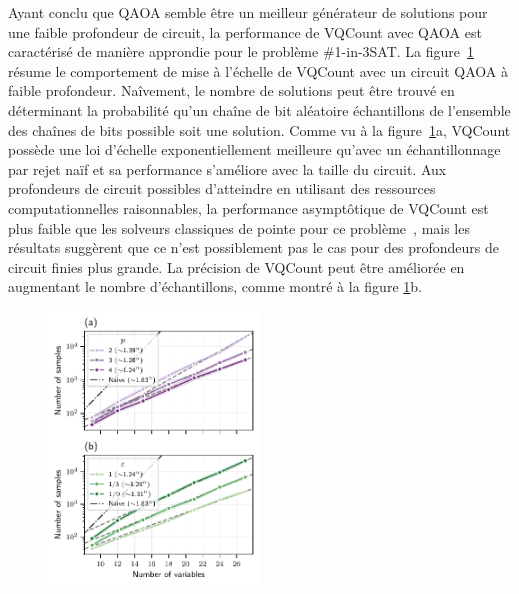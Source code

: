 Ayant conclu que QAOA semble être un meilleur générateur de solutions pour une faible profondeur de circuit, la performance de VQCount avec QAOA est caractérisé de manière approndie pour le problème \#1-in-3SAT. La figure~\ref{fig:1in3sat-number-of-samples} résume le comportement de mise à l'échelle de VQCount avec un circuit QAOA à faible profondeur. Naîvement, le nombre de solutions peut être trouvé en déterminant la probabilité qu'un chaîne de bit aléatoire échantillons de l'ensemble des chaînes de bits possible soit une solution. Comme vu à la figure~\ref{fig:1in3sat-number-of-samples}a, VQCount possède une loi d'échelle exponentiellement meilleure qu'avec un échantillonnage par rejet naïf et sa performance s'améliore avec la taille du circuit. Aux profondeurs de circuit possibles d'atteindre en utilisant des ressources computationnelles raisonnables, la performance asymptôtique de VQCount est plus faible que les solveurs classiques de pointe pour ce problème~\cite{kourtisFastCountingTensor2019}, mais les résultats suggèrent que ce n'est possiblement pas le cas pour des profondeurs de circuit finies plus grande. La précision de VQCount peut être améliorée en augmentant le nombre d'échantillons, comme montré à la figure \ref{fig:1in3sat-number-of-samples}b.

\begin{figure}[ht!]
    \centering
    \includegraphics[width=0.5\textwidth]{figures/1in3sat-number-of-samples.pdf}
    \caption{}
    \label{fig:1in3sat-number-of-samples}
\end{figure}




